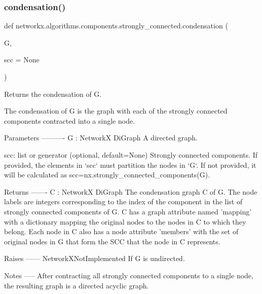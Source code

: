 \subsubsection{\texorpdfstring{condensation()}{condensation()}}
{\footnotesize\ttfamily def networkx.\+algorithms.\+components.\+strongly\+\_\+connected.\+condensation (\begin{DoxyParamCaption}\item[{}]{G,  }\item[{}]{scc = {\ttfamily None} }\end{DoxyParamCaption})}

\begin{DoxyVerb}Returns the condensation of G.

The condensation of G is the graph with each of the strongly connected
components contracted into a single node.

Parameters
----------
G : NetworkX DiGraph
   A directed graph.

scc:  list or generator (optional, default=None)
   Strongly connected components. If provided, the elements in
   `scc` must partition the nodes in `G`. If not provided, it will be
   calculated as scc=nx.strongly_connected_components(G).

Returns
-------
C : NetworkX DiGraph
   The condensation graph C of G.  The node labels are integers
   corresponding to the index of the component in the list of
   strongly connected components of G.  C has a graph attribute named
   'mapping' with a dictionary mapping the original nodes to the
   nodes in C to which they belong.  Each node in C also has a node
   attribute 'members' with the set of original nodes in G that
   form the SCC that the node in C represents.

Raises
------
NetworkXNotImplemented
    If G is undirected.

Notes
-----
After contracting all strongly connected components to a single node,
the resulting graph is a directed acyclic graph.\end{DoxyVerb}
 \mbox{\label{namespacenetworkx_1_1algorithms_1_1components_1_1strongly__connected_afc66a3236f5ff49c616cd4e79f3eb9a6}} 
